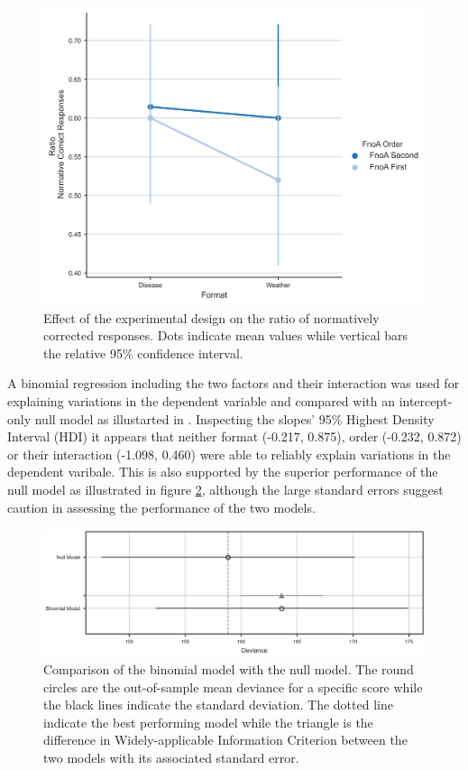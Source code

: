 \documentclass{article}
\begin{document}


\begin{figure}[h!]
    \centering
    \includegraphics[scale=0.75]{plots/exper_design.png}
    \caption{Effect of the experimental design on the ratio of normatively corrected responses. Dots indicate mean values while vertical bars the relative 95\% confidence interval.}
    \label{factor_plot}
\end{figure}

A binomial regression including the two factors and their interaction was used for explaining variations in the dependent variable and compared with an intercept-only null model as illustarted in \cite{mcelreath2020statistical}. Inspecting the slopes' 95\% Highest Density Interval (HDI) it appears that neither format (-0.217, 0.875), order (-0.232, 0.872) or their interaction (-1.098, 0.460) were able to reliably explain variations in the dependent varibale. This is also supported by the superior performance of the null model as illustrated in figure \ref{deviance_plot}, although the large standard errors suggest caution in assessing the performance of the two models.

\begin{figure}[h!]
    \centering
    \includegraphics[scale=0.75]{plots/model_comp_deviance.png}
    \caption{Comparison of the binomial model with the null model. The round circles are the out-of-sample mean deviance for a specific score while the black lines indicate the standard deviation. The dotted line indicate the best performing model while the triangle is the difference in Widely-applicable Information Criterion \cite{watanabe2010asymptotic} between the two models with its associated standard error.}
    \label{deviance_plot}
\end{figure}
\end{document}
